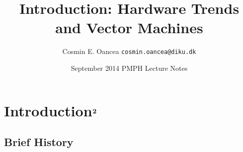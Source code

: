 \documentclass{beamer}
\title[Intro]{Introduction: Hardware Trends\\and Vector Machines}
\author[C.~Oancea]{Cosmin E. Oancea {\tt cosmin.oancea@diku.dk}}
\institute{Department of Computer Science (DIKU)\\University of Copenhagen}
\date[Sept 2014]{September 2014 PMPH Lecture Notes}
\begin{document}
\titleslide


\begin{frame}[fragile]
	\tableofcontents
\end{frame}



\section{Introduction$^{\mbox{\bf 2}}$}

\subsection{Brief History}
\end{document}
